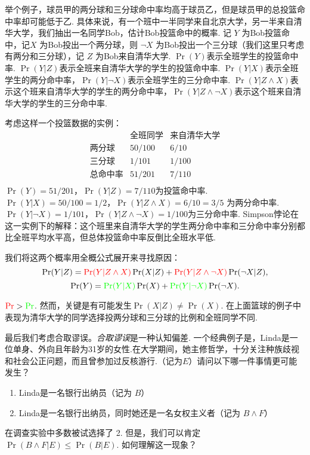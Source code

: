 举个例子，球员甲的两分球和三分球命中率均高于球员乙，但是球员甲的总投篮命中率却可能低于乙. 具体来说，有一个班中一半同学来自北京大学，另一半来自清华大学，我们抽出一名同学Bob，估计Bob投篮命中的概率. 记 $Y$ 为Bob投篮命中，记$X$ 为Bob投出一个两分球，则 $\neg X$ 为Bob投出一个三分球（我们这里只考虑有两分和三分球），记 $Z$ 为Bob来自清华大学. $\Pr(Y)$表示全班学生的投篮命中率. $\Pr(Y|Z)$表示全班来自清华大学的学生的投篮命中率. $\Pr(Y|X)$表示全班学生的两分命中率，$\Pr(Y|\neg X)$表示全班学生的三分命中率. $\Pr(Y|Z \wedge X)$表示这个班来自清华大学的学生的两分命中率，$\Pr(Y|Z \wedge \neg X)$表示这个班来自清华大学的学生的三分命中率.

考虑这样一个投篮数据的实例：
    \[
    \begin{array}{c|cc}
          & \text{全班同学} & \text{来自清华大学} \\ \hline
         \text{两分球} & 50/100 & 6/10 \\
         \text{三分球} & 1/101 & 1/100 \\
         \text{总命中率} & 51/201 & 7/110 \\
    \end{array}
    \]
$\Pr(Y) = 51/201$，$\Pr(Y|Z) = 7/110$为投篮命中率. $\Pr(Y|X) = 50/100 = 1/2$，$\Pr(Y|Z \wedge X) = 6/10 = 3/5$ 为两分命中率. $\Pr(Y|\neg X) = 1/101$，$\Pr(Y|Z \wedge \neg X) = 1/100$为三分命中率. Simpson悖论在这一实例下的解释：这个班里来自清华大学的学生两分命中率和三分命中率分别都比全班平均水平高，但总体投篮命中率反倒比全班水平低.

我们将这两个概率用全概公式展开来寻找原因：
$$\Pr(Y|Z) = \textcolor{red}{\Pr(Y|Z\land X)}\Pr(X|Z) + \textcolor{red}{\Pr(Y|Z\wedge\neg X)}\Pr(\neg X|Z),$$
$$\Pr(Y) = \textcolor{green}{\Pr(Y|X)}\Pr(X) +\textcolor{green}{ \Pr(Y|\neg X)}\Pr(\neg X).$$

$\textcolor{red}{\Pr}>\textcolor{green}{\Pr}$. 然而，关键是有可能发生$\Pr(X|Z) \neq \Pr(X)$. 在上面篮球的例子中表现为清华大学的同学选择投两分球和三分球的比例和全班同学不同.

最后我们考虑合取谬误。\emph{合取谬误}是一种认知偏差. 一个经典例子是，Linda是一位单身、外向且年龄为31岁的女性.在大学期间，她主修哲学，十分关注种族歧视和社会公正问题，而且曾参加过反核游行.（记为$E$）请问以下哪一件事情更可能发生？
    \begin{enumerate}
        \item Linda是一名银行出纳员（记为 $B$）
        \item Linda是一名银行出纳员，同时她还是一名女权主义者（记为 $B\wedge F$）
    \end{enumerate}
在调查实验中多数被试选择了 2. 但是，我们可以肯定 $\Pr(B \land F|E) \le \Pr(B|E)$. 如何理解这一现象？

